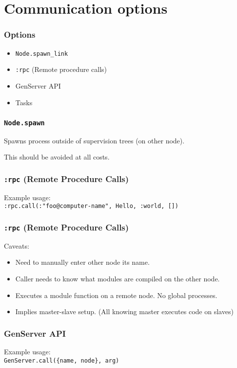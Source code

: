 \section{Communication options}

\frame{\tableofcontents[currentsection]}

\begin{frame}
    \frametitle{Options}
    \begin{itemize}
        \item \texttt{Node.spawn\_link}
        \item \texttt{:rpc} (Remote procedure calls)
        \item GenServer API
        \item Tasks
    \end{itemize}
\end{frame}

\begin{frame}
    \frametitle{\texttt{Node.spawn}}
    Spawns process outside of supervision trees (on other node). 
    
    \vfill

    This should be avoided at all costs.
\end{frame}

\begin{frame}
    \frametitle{\texttt{:rpc} (Remote Procedure Calls)}
    Example usage: \\
    \texttt{:rpc.call(:"foo@computer-name", Hello, :world, [])}
    \vfill
\end{frame}

\begin{frame}
    \frametitle{\texttt{:rpc} (Remote Procedure Calls)}
    Caveats: 
    \begin{itemize}
        \item Need to manually enter other node its name.
        \item Caller needs to know what modules are compiled on the other node.
        \item Executes a module function on a remote node. No global processes.
        \item Implies master-slave setup. (All knowing master executes code on slaves)
    \end{itemize}
\end{frame}

\begin{frame}
    \frametitle{GenServer API}
    Example usage: \\
    \texttt{GenServer.call(\{name, node\}, arg)}
    \vfill
\end{frame}

